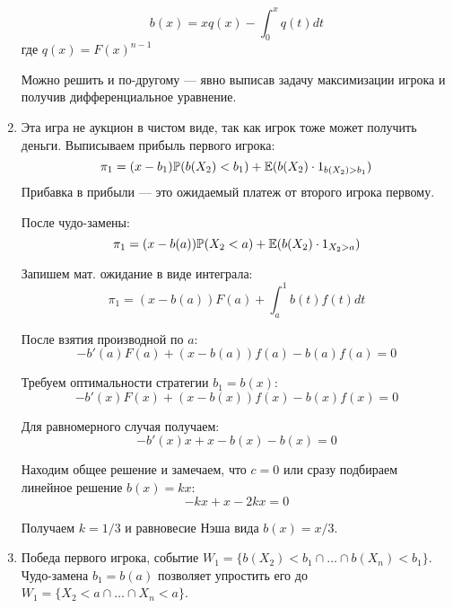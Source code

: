 \begin{enumerate}
\begin{equation}
\label{NE_all_pay}
b(x)=xq(x)-\int_{0}^{x}q(t)dt
\end{equation}
где $ q(x)=F(x)^{n-1} $

Можно решить и по-другому — явно выписав задачу максимизации игрока и получив дифференциальное уравнение.


\item Эта игра не аукцион в чистом виде, так как игрок тоже может получить деньги.
Выписываем прибыль первого игрока:
\begin{equation}
\pi_{1}=(x-b_{1})\mathbb{P}(b(X_{2})<b_{1})+\mathbb{E}(b(X_{2})\cdot 1_{b(X_{2})>b_{1}})
\end{equation}
Прибавка в прибыли — это ожидаемый платеж от второго игрока первому.

После чудо-замены:
\begin{equation}
\pi_{1}=(x-b(a))\mathbb{P}(X_{2}<a)+\mathbb{E}(b(X_{2})\cdot 1_{X_{2}>a})
\end{equation}

Запишем мат. ожидание в виде интеграла:
\begin{equation}
\pi_{1}=(x-b(a))F(a)+\int_{a}^{1}b(t)f(t)dt
\end{equation}

После взятия производной по $ a $:
\begin{equation}
-b'(a)F(a)+(x-b(a))f(a)-b(a)f(a)=0
\end{equation}

Требуем оптимальности стратегии  $ b_{1}=b(x) $:
\begin{equation}
-b'(x)F(x)+(x-b(x))f(x)-b(x)f(x)=0
\end{equation}

Для равномерного случая получаем:
\begin{equation}
-b'(x)x+x-b(x)-b(x)=0
\end{equation}

Находим общее решение и замечаем, что $ c=0 $ или сразу подбираем линейное решение $ b(x)=kx $:
\begin{equation}
-kx+x-2kx=0
\end{equation}

Получаем $ k=1/3 $ и равновесие Нэша вида $ b(x)=x/3 $.



\item

Победа первого игрока, событие $ W_{1}=\{b(X_{2})<b_{1}\cap \ldots\cap b(X_{n})<b_{1}\} $. Чудо-замена  $ b_{1}=b(a) $ позволяет упростить его до $ W_{1}=\{X_{2}<a\cap\ldots\cap X_{n}<a\} $.


\end{enumerate}
